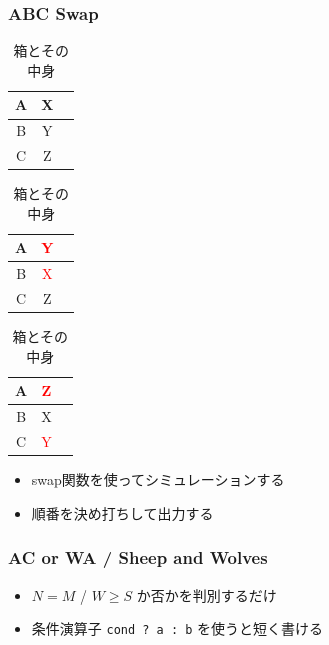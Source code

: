 \documentclass[t, aspectratio=169, dvipdfmx]{beamer}
\begin{document}
\begin{frame}
  \frametitle{ABC Swap}
  \begin{table}
    \caption{箱とその中身}
    \begin{minipage}{0.2\hsize}
      \begin{center}
        \begin{tabular}{|c|c|c|} \hline
          A & X \\ \hline
          B & Y \\ \hline
          C & Z \\ \hline
        \end{tabular}
      \end{center}
    \end{minipage}
    \begin{minipage}{0.2\hsize}
      \begin{center}
        \begin{tabular}{|c|c|c|} \hline
          A & \textcolor{red}{Y} \\ \hline
          B & \textcolor{red}{X} \\ \hline
          C & Z \\ \hline
        \end{tabular}
      \end{center}
    \end{minipage}
    \begin{minipage}{0.2\hsize}
      \begin{center}
        \begin{tabular}{|c|c|c|} \hline
          A & \textcolor{red}{Z} \\ \hline
          B & X \\ \hline
          C & \textcolor{red}{Y} \\ \hline
        \end{tabular}
      \end{center}
    \end{minipage}
  \end{table}
  \begin{itemize}
    \item swap関数を使ってシミュレーションする
    \item 順番を決め打ちして出力する
  \end{itemize}
\end{frame}

\begin{frame}[containsverbatim]
  \frametitle{AC or WA / Sheep and Wolves}
  \begin{itemize}
    \item $N=M$ / $W \geq S$ か否かを判別するだけ
    \item 条件演算子 \verb|cond ? a : b| を使うと短く書ける
  \end{itemize}
\end{frame}
\end{document}

